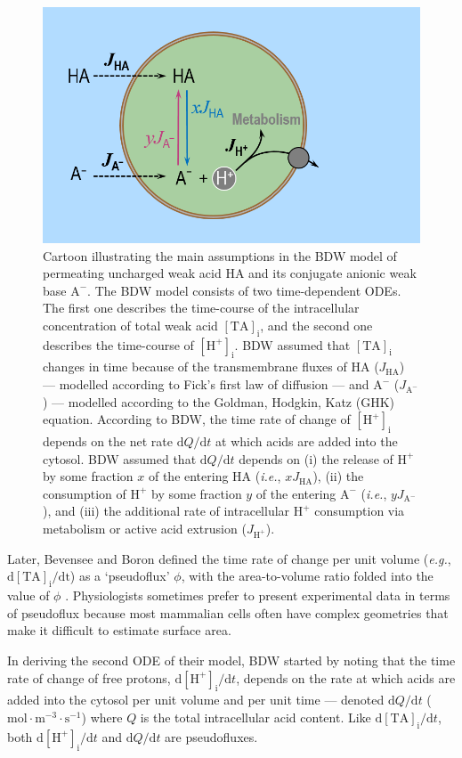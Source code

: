 \documentclass[fleqn,10pt]{physiome}
\begin{document}
\begin{figure}[ht]
\centering
\includegraphics[width=0.5\linewidth]{img/Figure 3.png}
\caption{\label{fig:3} Cartoon illustrating the main assumptions in the BDW model of permeating uncharged weak acid $\mathrm{HA}$ and its conjugate anionic weak base $\mathrm{A^-}$. The BDW model consists of two time-dependent ODEs. The first one describes the time-course of the intracellular concentration of total weak acid $\mathrm{[TA]_i}$, and the second one describes the time-course of $\mathrm{[H^+]_i}$. BDW assumed that $\mathrm{[TA]_i}$ changes in time because of the transmembrane fluxes of $\mathrm{HA}$ ($J_\mathrm{HA}$) --- modelled according to Fick's first law of diffusion --- and $\mathrm{A^-}$ ($J_\mathrm{A^-}$) --- modelled according to the Goldman, Hodgkin, Katz (GHK) equation. According to BDW, the time rate of change of $\mathrm{[H^+]_i}$ depends on the net rate $\mathrm{d}Q/\mathrm{d}t$ at which acids are added into the cytosol. BDW assumed that $\mathrm{d}Q/\mathrm{d}t$ depends on (i) the release of $\mathrm{H^+}$ by some fraction $x$ of the entering $\mathrm{HA}$ (\emph{i.e.}, $xJ_\mathrm{HA}$), (ii) the consumption of $\mathrm{H^+}$ by some fraction $y$ of the entering $\mathrm{A^-}$ (\emph{i.e.}, $yJ_\mathrm{A^-}$), and (iii) the additional rate of intracellular $\mathrm{H^+}$ consumption via metabolism or active acid extrusion ($J_\mathrm{H^+}$).}
\end{figure}

Later, Bevensee and Boron defined the time rate of change per unit volume (\emph{e.g.}, $\mathrm{d[TA]_i/dt}$) as a `pseudoflux' $\phi$, with the area-to-volume ratio folded into the value of $\phi$ \citep{bevensee2013control}. Physiologists sometimes prefer to present experimental data in terms of pseudoflux because most mammalian cells often have complex geometries that make it difficult to estimate surface area.

In deriving the second ODE of their model, BDW started by noting that the time rate of change of free protons, $\mathrm{d[H^+]_i}/\mathrm{d}t$, depends on the rate at which acids are added into the cytosol per unit volume and per unit time --- denoted $\mathrm{d}Q/\mathrm{d}t$ ($\mathrm{mol\cdot m^{-3}\cdot s^{-1}}$) where $Q$ is the total intracellular acid content. Like $\mathrm{d[TA]_i}/\mathrm{d}t$, both $\mathrm{d[H^+]_i}/\mathrm{d}t$ and $\mathrm{d}Q/\mathrm{d}t$ are pseudofluxes.
\end{document}
